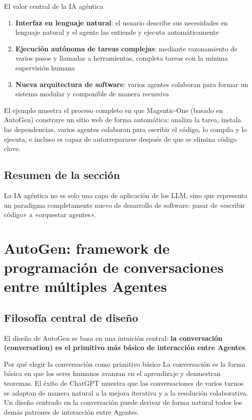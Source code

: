 \documentclass[a4paper]{article}
\begin{document}
\begin{importantbox}{El valor central de la IA agéntica}
\begin{enumerate}
    \item \textbf{Interfaz en lenguaje natural}: el usuario describe sus necesidades en lenguaje natural y el agente las entiende y ejecuta automáticamente
    \item \textbf{Ejecución autónoma de tareas complejas}: mediante razonamiento de varios pasos y llamadas a herramientas, completa tareas con la mínima supervisión humana
    \item \textbf{Nueva arquitectura de software}: varios agentes colaboran para formar un sistema modular y componible de manera recursiva
\end{enumerate}
\end{importantbox}

El ejemplo muestra el proceso completo en que Magentic-One (basado en AutoGen) construye un sitio web de forma automática: analiza la tarea, instala las dependencias, varios agentes colaboran para escribir el código, lo compila y lo ejecuta, e incluso es capaz de autorrepararse después de que se elimina código clave.

\subsection{Resumen de la sección}

La IA agéntica no es solo una capa de aplicación de los LLM, sino que representa un paradigma completamente nuevo de desarrollo de software: pasar de «escribir código» a «orquestar agentes».

\section{AutoGen: framework de programación de conversaciones entre múltiples Agentes}

\subsection{Filosofía central de diseño}

El diseño de AutoGen se basa en una intuición central: \textbf{la conversación (conversation) es el primitivo más básico de interacción entre Agentes}.

\begin{knowledgebox}{Por qué elegir la conversación como primitivo básico}
La conversación es la forma básica en que los seres humanos avanzan en el aprendizaje y demuestran teoremas. El éxito de ChatGPT muestra que las conversaciones de varios turnos se adaptan de manera natural a la mejora iterativa y a la resolución colaborativa. Un diseño centrado en la conversación puede derivar de forma natural todos los demás patrones de interacción entre Agentes.
\end{knowledgebox}
\end{document}
